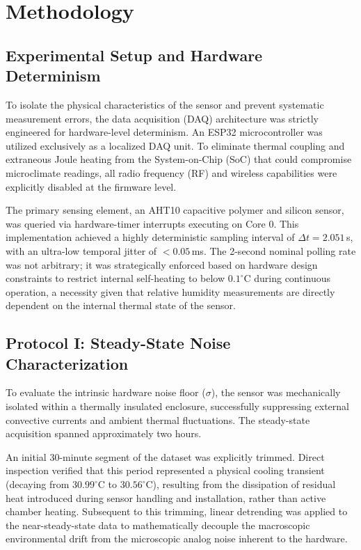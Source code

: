 \section{Methodology}

\subsection{Experimental Setup and Hardware Determinism}
To isolate the physical characteristics of the sensor and prevent systematic measurement errors, 
the data acquisition (DAQ) architecture was strictly engineered for hardware-level determinism. 
An ESP32 microcontroller was utilized exclusively as a localized DAQ unit. 
To eliminate thermal coupling and extraneous Joule heating from the System-on-Chip (SoC) that could compromise microclimate readings, 
all radio frequency (RF) and wireless capabilities were explicitly disabled at the firmware level. 

The primary sensing element, an AHT10 capacitive polymer and silicon sensor, 
was queried via hardware-timer interrupts executing on Core 0. This implementation achieved a highly deterministic sampling interval of $\Delta t = 2.051$\,s, 
with an ultra-low temporal jitter of $<0.05$\,ms. The 2-second nominal polling rate was not arbitrary; 
it was strategically enforced based on hardware design constraints \cite{aht10_datasheet} to restrict internal self-heating to below $0.1^\circ$C during continuous operation, 
a necessity given that relative humidity measurements are directly dependent on the internal thermal state of the sensor.

\subsection{Protocol I: Steady-State Noise Characterization}
To evaluate the intrinsic hardware noise floor ($\sigma$), 
the sensor was mechanically isolated within a thermally insulated enclosure, 
successfully suppressing external convective currents and ambient thermal fluctuations. 
The steady-state acquisition spanned approximately two hours. 

An initial 30-minute segment of the dataset was explicitly trimmed. 
Direct inspection verified that this period represented a physical cooling transient (decaying from $30.99^\circ$C to $30.56^\circ$C), 
resulting from the dissipation of residual heat introduced during sensor handling and installation, rather than active chamber heating. 
Subsequent to this trimming, linear detrending was applied to the near-steady-state data to mathematically decouple the macroscopic environmental drift from the microscopic analog noise inherent to the hardware.

